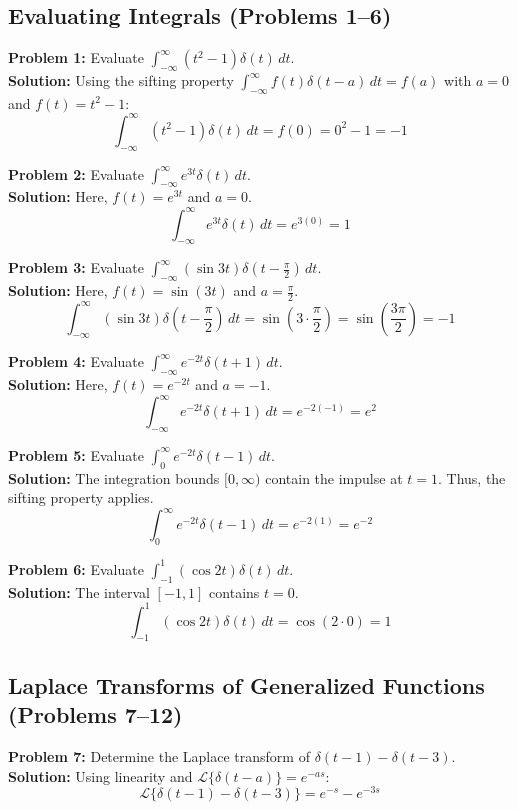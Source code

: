 \documentclass[11pt, letterpaper]{article}
\theoremstyle{definition}
\theoremstyle{remark}
\newcommand{\Laplace}{\mathcal{L}}
\begin{document}
\subsection{Evaluating Integrals (Problems 1--6)}

\textbf{Problem 1:} Evaluate $\int_{-\infty}^{\infty} (t^2 - 1)\delta(t) \, dt$.
\\[4pt]
\textbf{Solution:} Using the sifting property $\int_{-\infty}^{\infty} f(t)\delta(t-a) \, dt = f(a)$ with $a=0$ and $f(t) = t^2 - 1$:
\[ \int_{-\infty}^{\infty} (t^2 - 1)\delta(t) \, dt = f(0) = 0^2 - 1 = -1 \]

\textbf{Problem 2:} Evaluate $\int_{-\infty}^{\infty} e^{3t}\delta(t) \, dt$.
\\[4pt]
\textbf{Solution:} Here, $f(t) = e^{3t}$ and $a=0$.
\[ \int_{-\infty}^{\infty} e^{3t}\delta(t) \, dt = e^{3(0)} = 1 \]

\textbf{Problem 3:} Evaluate $\int_{-\infty}^{\infty} (\sin 3t)\delta\left(t - \frac{\pi}{2}\right) \, dt$.
\\[4pt]
\textbf{Solution:} Here, $f(t) = \sin(3t)$ and $a = \frac{\pi}{2}$.
\[ \int_{-\infty}^{\infty} (\sin 3t)\delta\left(t - \frac{\pi}{2}\right) \, dt = \sin\left(3 \cdot \frac{\pi}{2}\right) = \sin\left(\frac{3\pi}{2}\right) = -1 \]

\textbf{Problem 4:} Evaluate $\int_{-\infty}^{\infty} e^{-2t}\delta(t + 1) \, dt$.
\\[4pt]
\textbf{Solution:} Here, $f(t) = e^{-2t}$ and $a = -1$.
\[ \int_{-\infty}^{\infty} e^{-2t}\delta(t + 1) \, dt = e^{-2(-1)} = e^2 \]

\textbf{Problem 5:} Evaluate $\int_{0}^{\infty} e^{-2t}\delta(t - 1) \, dt$.
\\[4pt]
\textbf{Solution:} The integration bounds $[0, \infty)$ contain the impulse at $t=1$. Thus, the sifting property applies.
\[ \int_{0}^{\infty} e^{-2t}\delta(t - 1) \, dt = e^{-2(1)} = e^{-2} \]

\textbf{Problem 6:} Evaluate $\int_{-1}^{1} (\cos 2t)\delta(t) \, dt$.
\\[4pt]
\textbf{Solution:} The interval $[-1, 1]$ contains $t=0$.
\[ \int_{-1}^{1} (\cos 2t)\delta(t) \, dt = \cos(2 \cdot 0) = 1 \]

\subsection{Laplace Transforms of Generalized Functions (Problems 7--12)}

\textbf{Problem 7:} Determine the Laplace transform of $\delta(t - 1) - \delta(t - 3)$.
\\[4pt]
\textbf{Solution:} Using linearity and $\Laplace\{\delta(t-a)\} = e^{-as}$:
\[ \Laplace\{\delta(t - 1) - \delta(t - 3)\} = e^{-s} - e^{-3s} \]
\end{document}
